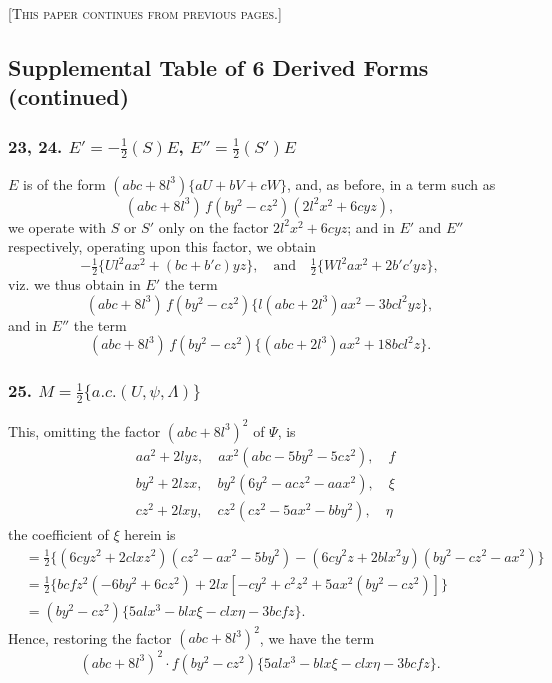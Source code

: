 \documentclass[11pt,a4paper]{article}
\theoremstyle{definition}
\begin{document}
\textsc{[This paper continues from previous pages.]}

\subsection*{Supplemental Table of 6 Derived Forms (continued)}

\subsubsection*{23, 24. $E' = -\frac{1}{2}(S)E$, $E'' = \frac{1}{2}(S')E$}

$E$ is of the form $(abc + 8l^3)\{aU + bV + cW\}$, and, as before, in a term such as
\[
(abc + 8l^3)\,f(by^2 - cz^2)(2l^2x^2 + 6cyz),
\]
we operate with $S$ or $S'$ only on the factor $2l^2x^2 + 6cyz$; and in $E'$ and $E''$ respectively, operating upon this factor, we obtain
\[
-\tfrac{1}{2}\{U l^2ax^2 + (bc + b'c)yz\},\quad \text{and}\quad \tfrac{1}{2}\{W l^2ax^2 + 2b'c'yz\},
\]
viz. we thus obtain in $E'$ the term
\[
(abc + 8l^3)\,f(by^2 - cz^2)\{l(abc + 2l^3)ax^2 - 3bcl^2yz\},
\]
and in $E''$ the term
\[
(abc + 8l^3)\,f(by^2 - cz^2)\{(abc + 2l^3)ax^2 + 18bcl^2z\}.
\]

\subsubsection*{25. $M = \frac{1}{2}\{a.c.(U, \psi, \Lambda)\}$}

This, omitting the factor $(abc + 8l^3)^2$ of $\Psi$, is
\[
\begin{aligned}
&aa^2 + 2lyz,\quad ax^2(abc - 5by^2 - 5cz^2),\quad f \\
&by^2 + 2lzx,\quad by^2(6y^2 - acz^2 - aax^2),\quad \xi \\
&cz^2 + 2lxy,\quad cz^2(cz^2 - 5ax^2 - bby^2),\quad \eta
\end{aligned}
\]
the coefficient of $\xi$ herein is
\[
\begin{aligned}
&= \tfrac{1}{2}\{(6cyz^2 + 2clxz^2)(cz^2 - ax^2 - 5by^2) - (6cy^2z + 2blx^2y)(by^2 - cz^2 - ax^2)\}\\
&= \tfrac{1}{2}\{bcfz^2(-6by^2 + 6cz^2) + 2lx[-cy^2 + c^2z^2 + 5ax^2(by^2 - cz^2)]\}\\
&= (by^2 - cz^2)\{5alx^3 - blx\xi - clx\eta - 3bcfz\}.
\end{aligned}
\]
Hence, restoring the factor $(abc + 8l^3)^2$, we have the term
\[
(abc + 8l^3)^2 \cdot f(by^2 - cz^2)\{5alx^3 - blx\xi - clx\eta - 3bcfz\}.
\]
\end{document}
